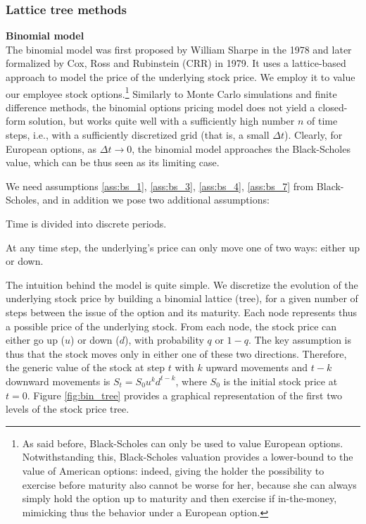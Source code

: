 \subsubsection{Lattice tree methods} 
\textbf{Binomial model}\\
The binomial model was first proposed by William Sharpe in the 1978 \citep{sharpe1978investments} and later formalized by Cox, Ross and Rubinstein (CRR) in 1979. It uses a lattice-based approach to model the price of the underlying stock price. We employ it to value our employee stock options.\footnote{As said before, Black-Scholes can only be used to value European options. Notwithstanding this, Black-Scholes valuation provides a lower-bound to the value of American options: indeed, giving the holder the possibility to exercise before maturity also cannot be worse for her, because she can always simply hold the option up to maturity and then exercise if in-the-money, mimicking thus the behavior under a European option.}
Similarly to Monte Carlo simulations and finite difference methods, the binomial options pricing model does not yield a closed-form solution, but works quite well with a sufficiently high number $n$ of time steps, i.e., with a sufficiently discretized grid (that is, a small $\Delta t$). Clearly, for European options, as $\Delta t \rightarrow 0$, the binomial model approaches the Black-Scholes value, which can be thus seen as its limiting case.

We need assumptions \ref*{ass:bs_1}, \ref*{ass:bs_3}, \ref*{ass:bs_4}, \ref*{ass:bs_7} from Black-Scholes, and in addition we pose two additional assumptions:

\begin{assumption}
    \label{ass:bin_8}
    Time is divided into discrete periods.
\end{assumption}

\begin{assumption}
    \label{ass:bin_9}
    At any time step, the underlying's price can only move one of two ways: either up or down.
\end{assumption}

 

The intuition behind the model is quite simple. We discretize the evolution of the underlying stock price by building a binomial lattice (tree), for a given number of steps between the issue of the option and its maturity. Each node represents thus a possible price of the underlying stock. From each node, the stock price can either go up ($u$) or down ($d$), with probability $q$ or $1-q$. The key assumption is thus that the stock moves only in either one of these two directions. Therefore, the generic value of the stock at step $t$ with $k$ upward movements and $t-k$ downward movements is $S_t = S_0 u^k d^{t-k}$, where $S_0$ is the initial stock price at $t=0$. Figure \ref*{fig:bin_tree} provides a graphical representation of the first two levels of the stock price tree. 
 

